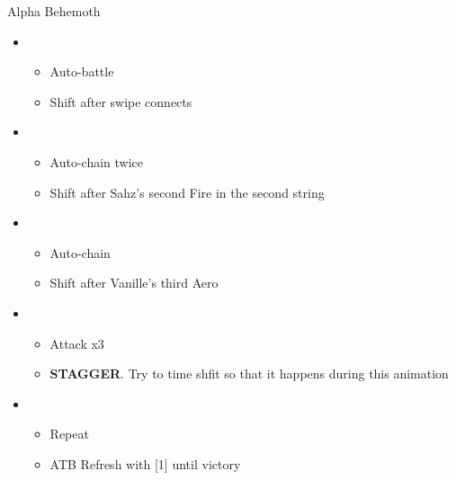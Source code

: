 \begin{battle}{Alpha Behemoth}
\begin{itemize}
    \item \first
    \begin{itemize}
        \item Auto-battle
        \item Shift after swipe connects
    \end{itemize}
    \item \third
    \begin{itemize}
        \item Auto-chain twice
        \item Shift after Sahz's second Fire in the second string
    \end{itemize}
    \item \fourth
    \begin{itemize}
        \item Auto-chain
        \item Shift after Vanille's third Aero
    \end{itemize}
    \item \first
    \begin{itemize}
        \item Attack x3
        \item \textbf{STAGGER}. Try to time shfit so that it happens during this animation
    \end{itemize}
    \item \fifth
    \begin{itemize}
        \item Repeat
        \item ATB Refresh with [1] until victory
    \end{itemize}
\end{itemize}
\end{battle}



 

